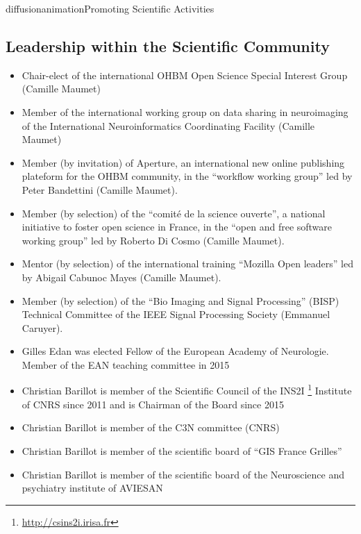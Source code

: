 \documentclass{ra2018}
\begin{document}
\begin{module}{diffusion}{animation}{Promoting Scientific Activities}
\subsection{Leadership within the Scientific Community}
\begin{itemize}
    \item Chair-elect of the international OHBM Open Science Special Interest Group (Camille Maumet)
    \item Member of the international working group on data sharing in neuroimaging of the International Neuroinformatics Coordinating Facility (Camille Maumet)
    \item Member (by invitation) of Aperture, an international new online publishing plateform for the OHBM community, in the ``workflow working group'' led by Peter Bandettini  (Camille Maumet).
    \item Member (by selection) of the ``comité de la science ouverte'', a national initiative to foster open science in France, in the ``open and free software working group'' led by Roberto Di Cosmo  (Camille Maumet).
    \item Mentor (by selection) of the international training ``Mozilla Open leaders'' led by Abigail Cabunoc Mayes (Camille Maumet).
    \item Member (by selection) of the ``Bio Imaging and Signal Processing'' (BISP) Technical Committee of the IEEE Signal Processing Society (Emmanuel Caruyer).
     \item Gilles Edan was elected Fellow of the European Academy of Neurologie.
    Member of the EAN teaching committee in 2015
    \item Christian Barillot is member of the Scientific Council of the INS2I \footnote{\url{http://csins2i.irisa.fr}} Institute of CNRS since 2011 and is Chairman of the Board since 2015
    \item Christian Barillot is member of the C3N committee (CNRS)
    \item Christian Barillot is member of the scientific board of ``GIS France Grilles''
    \item Christian Barillot is member of the scientific board of the Neuroscience and psychiatry institute of AVIESAN
\end{itemize}    

\end{module}
\end{document}
